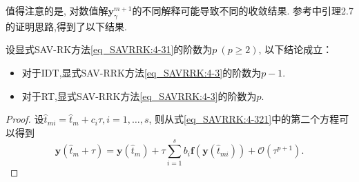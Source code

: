 值得注意的是, 对数值解$\bm{y}_\gamma^{m+1}$的不同解释可能导致不同的收敛结果.
参考\cite{ranochaGeneralRelaxationMethods2020}中引理2.7的证明思路,得到了以下结果.

\begin{theorem}\label{thm_SAVRRK:5_4}
设显式SAV-RK方法\eqref{eq_SAVRRK:4-31}的阶数为$p~(p \geq 2)$, 以下结论成立：
\begin{itemize}
\item 对于IDT,显式SAV-RRK方法\eqref{eq_SAVRRK:4-3}的阶数为$p-1$.
\item 对于RT,显式SAV-RRK方法\eqref{eq_SAVRRK:4-3}的阶数为$p$.
\end{itemize}
\end{theorem}


\begin{proof}
设$\hat{t}_{m i}=\hat{t}_m+c_i\tau, i=1, \ldots, s$,
则从式\eqref{eq_SAVRRK:4-321}中的第二个方程可以得到
\begin{equation}\label{eq_SAVRRK:4-321b}
\bm{y}\left(\hat{t}_m+\tau\right)=\bm{y}\left(\hat{t}_m\right)+\tau \sum_{i=1}^s b_i \bm{f}\left(\bm{y}\left(\hat{t}_{m i}\right)\right)+\mathcal{O}\left(\tau^{p+1}\right).
\end{equation}


\end{proof}
